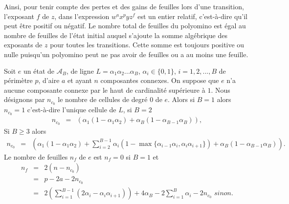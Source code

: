  Ainsi, pour tenir compte des pertes et des gains de feuilles lors d'une transition, l'exposant  $f$ de $z$, dans l'expression $ w^{a}x^{p}yz^{f}$ est un entier relatif, c'est-à-dire qu'il peut être positif ou négatif. Le nombre total de feuilles du polyomino est égal  au nombre de feuilles  de l'état initial auquel s'ajoute la somme algébrique des exposants de $z$ pour toutes les transitions. Cette somme est toujours positive ou nulle puisqu'un polyomino peut ne pas avoir de feuilles ou a au moins une feuille. %
 \begin{Prop}\label{prop13}
Soit $e$ un état de $\mathcal{A}_{B}$, de ligne $L=\alpha_{1}\alpha_{2}...\alpha_{B}$, $\alpha_{i}\in \{0,1\}$, $i=1,2,..., B$ de périmètre $p$,  d'aire  $a$ et ayant $n$  composantes connexes. On suppose que $e$ n'a aucune composante connexe par le haut de cardinalité supérieure à $1$. Nous désignons par $n_{c_{0}}$ le nombre de cellules de degré $0$ de $e$. Alors 
si $B=1$ alors $n_{c_{0}}=1$ c'est-à-dire l'unique cellule de $L$,
si $B=2$
\begin{eqnarray}
n_{c_{0}} & = & \left(\alpha_{1}(1-\alpha_{1}\alpha_{2})+\alpha_{B}(1-\alpha_{B-1}\alpha_{B})\right),\nonumber
\end{eqnarray}
Si $B\geq 3$ alors
\begin{eqnarray}\label{nc0}
n_{c_{0}} & = & \left(\alpha_{1}(1-\alpha_{1}\alpha_{2}) +\sum_{i=2}^{B-1}\alpha_{i}(1-\max\{\alpha_{i-1}\alpha_{i},\alpha_{i}\alpha_{i+1}\}) +\alpha_{B}(1-\alpha_{B-1}\alpha_{B})\right).\nonumber
\end{eqnarray}
Le nombre de feuilles $n_{f}$ de $e$ est 
$n_{f}=0$ si $B=1$ et
\begin{eqnarray}\label{for114}
n_{f} & = &  2(n - n_{c_{0}}) \nonumber\\
 & = &  p-2a - 2n_{c_{0}} \nonumber\\
& = & 2\left(\sum_{i=1}^{B-1}(2\alpha_{i}-\alpha_{i}\alpha_{i+1})\right) + 4\alpha_{B} -2\sum_{i=1}^{B}\alpha_{i} -2n_{c_{0}}\textit{ sinon.}
\end{eqnarray} 
\end{Prop}
